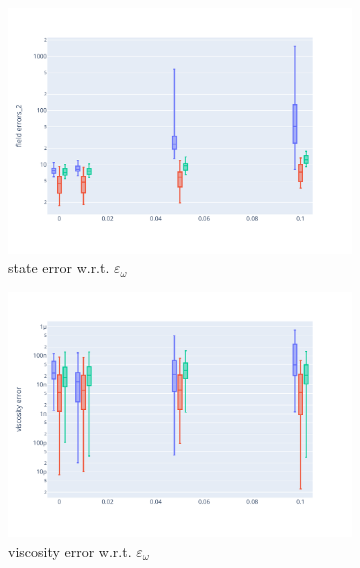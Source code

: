 \begin{figure}[htbp]
	\centering

	\begin{subfigure}{0.48\textwidth}
		\centering
		\includegraphics[width=\linewidth]{./images/app2d/MSE_eps_omega_box.pdf}
		\captionsetup{labelformat=empty}
		\caption{state error w.r.t. $\varepsilon_{\omega}$}
		\label{fig:eps_omega}
	\end{subfigure}
	\hfill
	\begin{subfigure}{0.48\textwidth}
		\centering
		\includegraphics[width=\linewidth]{./images/app2d/MSE_visc_eps_omega_box.pdf}
		\captionsetup{labelformat=empty}
		\caption{viscosity error w.r.t. $\varepsilon_{\omega}$}
		\label{fig:eps_omega_visc}
	\end{subfigure}
	\begin{subfigure}{0.48\textwidth}

\end{subfigure}
\end{figure}
